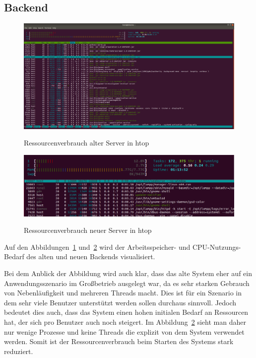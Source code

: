 \subsection{Backend}
\begin{figure}[ht]
   \centering
     \includegraphics[width=15cm]{Bilder/server-ihatestau} \\
 \caption{Ressourcenverbrauch alter Server in htop}
 \label{fig:ihatestau-res}
\end{figure}
\begin{figure}[ht]
   \centering
     \includegraphics[width=15cm]{Bilder/server-new} \\
 \caption{Ressourcenverbrauch neuer Server in htop}
 \label{fig:new-server-res}
\end{figure}

Auf den Abbildungen~\ref{fig:ihatestau-res} und~\ref{fig:new-server-res} wird der Arbeitsspeicher- und CPU-Nutzungs-Bedarf des alten und neuen Backends visualisiert.

Bei dem Anblick der Abbildung wird auch klar, dass das alte System eher auf ein Anwendungsszenario im Großbetrieb ausgelegt war, da es sehr starken Gebrauch von Nebenläufigkeit und mehreren Threads macht.
Dies ist für ein Szenario in dem sehr viele Benutzer unterstützt werden sollen durchaus sinnvoll.
Jedoch bedeutet dies auch, dass das System einen hohen initialen Bedarf an Ressourcen hat, der sich pro Benutzer auch noch steigert.
Im Abbildung~\ref{fig:new-server-res} sieht man daher nur wenige Prozesse und keine Threads die explizit von dem System verwendet werden.
Somit ist der Ressourcenverbrauch beim Starten des Systems stark reduziert.

